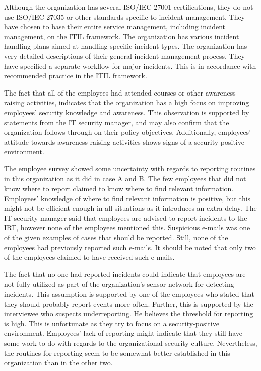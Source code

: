 Although the organization has several ISO/IEC 27001 certifications, they do not use ISO/IEC 27035 or other standards specific to incident management. They have chosen to base their entire service management, including incident management, on the ITIL framework. The organization has various incident handling plans aimed at handling specific incident types. The organization has very detailed descriptions of their general incident management process. They have specified a separate workflow for major incidents. This is in accordance with recommended practice in the ITIL framework. 
 
The fact that all of the employees had attended courses or other awareness raising activities, indicates that the organization has a high focus on improving employees' security knowledge and awareness. This observation is supported by statements from the IT security manager, and may also confirm that the organization follows through on their policy objectives. Additionally, employees' attitude towards awareness raising activities shows signs of a security-positive environment.  
 
The employee survey showed some uncertainty with regards to reporting routines in this organization as it did in case A and B. The few employees that did not know where to report claimed to know where to find relevant information. Employees' knowledge of where to find relevant information is positive, but this might not be efficient enough in all situations as it introduces an extra delay. The IT security manager said that employees are advised to report incidents to the \ac{IRT}, however none of the employees mentioned this. Suspicious e-mails was one of the given examples of cases that should be reported. Still, none of the employees had previously reported such e-mails. It should be noted that only two of the employees claimed to have received such e-mails. 

The fact that no one had reported incidents could indicate that employees are not fully utilized as part of the organization's sensor network for detecting incidents. This assumption is supported by one of the employees who stated that they should probably report events more often. Further, this is supported by the interviewee who suspects underreporting. He believes the threshold for reporting is high. This is unfortunate as they try to focus on a security-positive environment. Employees' lack of reporting might indicate that they still have some work to do with regards to the organizational security culture. Nevertheless, the routines for reporting seem to be somewhat better established in this organization than in the other two. 

